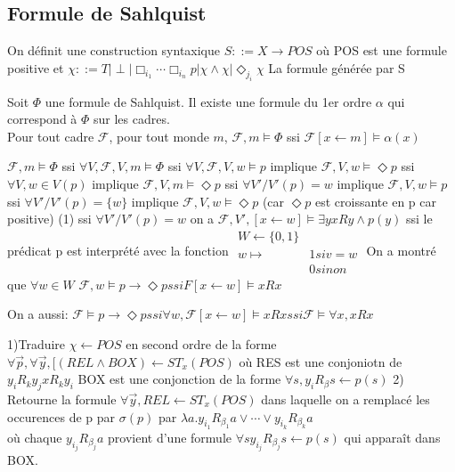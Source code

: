 \documentclass[a4paper,10pt]{article}
\newcommand{\F}{\mathcal{F}}
\begin{document}
\subsection{Formule de Sahlquist}
On définit une construction syntaxique 
$S ::= X \rightarrow POS$
où POS est une formule positive et $\chi ::= T | \perp | \Box_{i_1} \cdots \Box_{i_n}p | \chi \wedge \chi | \Diamond_{j_i} \chi$
La formule générée par S
\begin{thm}{} Soit $\Phi$ une formule de Sahlquist. Il existe une formule du 1er ordre $\alpha$ qui correspond à $\Phi$ sur les cadres.\\
Pour tout cadre $\F$, pour tout monde $m$,
$\F, m \models \Phi$ ssi $\F[x \leftarrow m] \models \alpha(x)$
\end{thm}
\begin{ex}{1}
$ \F, m \models \Phi$ ssi $\forall V, \F, V, m \models \Phi$
ssi $\forall V, \F, V, w \models p$ implique $\F, V, w \models \Diamond p$
ssi $\forall V, w \in V(p)$ implique $\F, V, m \models \Diamond p$
ssi $\forall V' / V'(p) = {w}$ implique $\F, V, w \models p$
ssi $\forall V' / V'(p) = \{ w \}$ implique $\F, V, w \models \Diamond p$
(car $\Diamond p$ est croissante en p car positive)
(1) ssi $\forall V' / V'(p) = w$ on a $\F, V', [x \leftarrow w ] \models \exists y xRy \wedge p(y)$
ssi le prédicat p est interprété avec la fonction 
$\begin{array}{ll}
 W \longleftarrow \{0, 1\}\\
 w \mapsto & 1 si v = w\\
	    & 0 sinon
\end{array}$
On a montré que $\forall w \in W$
$\F, w \models p \to \Diamond p ssi F[x \leftarrow w] \models x Rx$

On a aussi:
$\F \models p \to \Diamond p ssi \forall w, \F[x←w] \models xRx
			    ssi \F \models \forall x, xRx$
\end{ex}

1)Traduire $\chi \leftarrow POS$ en second ordre de la forme
$\forall \vec p, \forall \vec y, [(REL \wedge BOX) \leftarrow ST_x(POS)$
où RES est une conjoniotn de $y_i R_k y_j x R_k y_i$
   BOX est une conjonction de la forme $\forall s, y_i R_{\beta} s \leftarrow p(s)$
2) Retourne la formule $\forall \vec y, REL \leftarrow ST_x(POS)$ dans laquelle on a remplacé les occurences de p par 
$\sigma(p)$ par $\lambda a . y_{i_1} R_{\beta_1} a \vee \cdots \vee y_{i_k} R_{\beta_k} a$\\
où chaque $y_{i_j} R_{\beta_j} a$ provient d'une formule $\forall s y_{i_j} R_{\beta_j} s \leftarrow p(s)$ qui apparaît dans BOX.
\end{document}
